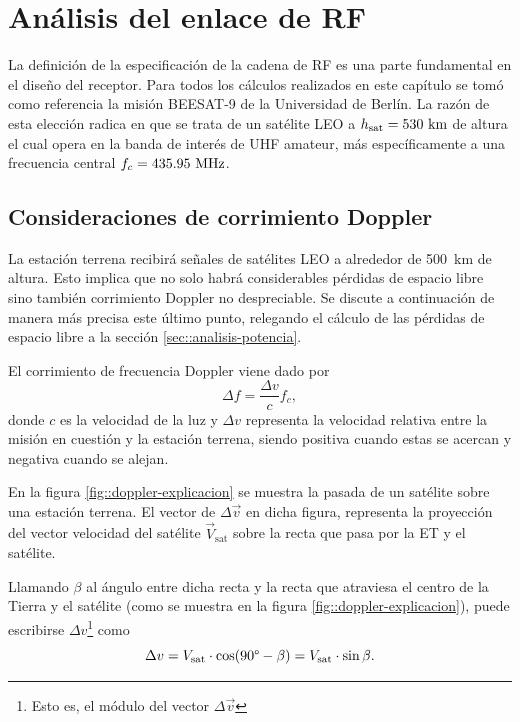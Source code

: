\documentclass[../../main.tex]{subfiles}
\begin{document}
\graphicspath{{./figures}}
\chapter{Análisis del enlace de RF}\label{cap::enlace}

La definición de la especificación de la cadena de RF es una parte fundamental en el diseño del receptor. 
Para todos los cálculos realizados en este capítulo se tomó como referencia la misión BEESAT-9 \cite{BEESAT-9} de la Universidad de Berlín. 
La razón de esta elección radica en que se trata de un satélite LEO a $h_\textrm{sat} = 530~\textrm{km}$ de altura el cual opera en la banda de interés de UHF amateur, más específicamente a una frecuencia central $f_c = 435.95~\textrm{MHz}$.

\section{Consideraciones de corrimiento Doppler}\label{sec::doppler}
La estación terrena recibirá señales de satélites LEO a alrededor de 500~km de altura. Esto implica que no solo habrá considerables pérdidas de espacio libre sino también corrimiento Doppler no despreciable. Se discute a continuación de manera más precisa este último punto, relegando el cálculo de las pérdidas de espacio libre a la sección \ref{sec::analisis-potencia}.

El corrimiento de frecuencia Doppler viene dado por
\begin{equation}
    \Delta f = \frac{\Delta v}{c} f_c,
\end{equation}
donde $c$ es la velocidad de la luz y $\Delta v$ representa la velocidad relativa entre la misión en cuestión y la estación terrena, siendo positiva cuando estas se acercan y negativa cuando se alejan.

En la figura \ref{fig::doppler-explicacion} se muestra la pasada de un satélite sobre una estación terrena. El vector de $\Delta \vec{v}$ en dicha figura, representa la proyección del vector velocidad del satélite $\vec{V}_\textrm{sat}$ sobre la recta que pasa por la ET y el satélite. 

Llamando $\beta$ al ángulo entre dicha recta y la recta que atraviesa el centro de la Tierra y el satélite (como se muestra en la figura \ref{fig::doppler-explicacion}), puede escribirse $\Delta v$\footnote{Esto es, el módulo del vector $\Delta \vec{v}$} como
\begin{equation}
    \Delta v = V_\textrm{sat} \cdot \cos(90\degree - \beta) = V_\textrm{sat} \cdot \sin \beta.
    \label{eq::delta-v}
\end{equation}
\end{document}
